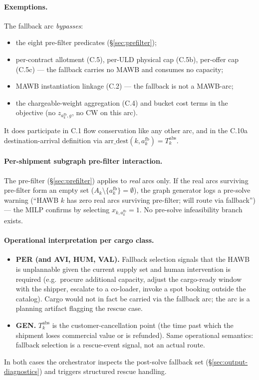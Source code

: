 \documentclass[11pt,a4paper]{article}
\theoremstyle{definition}
\begin{document}
\paragraph{Exemptions.}
The fallback arc \emph{bypasses}:
\begin{itemize}[noitemsep]
  \item the eight pre-filter predicates (\S\ref{sec:prefilter});
  \item per-contract allotment (C.5), per-ULD physical cap (C.5b), per-offer
        cap (C.5c) --- the fallback carries no MAWB and consumes no capacity;
  \item MAWB instantiation linkage (C.2) --- the fallback is not a MAWB-arc;
  \item the chargeable-weight aggregation (C.4) and bucket cost terms in the
        objective (no $z_{a^{\text{fb}}_k, g}$, no $\text{CW}$ on this arc).
\end{itemize}
It does participate in C.1 flow conservation like any other arc, and in the
C.10a destination-arrival definition via $\text{arr\_dest}(k, a^{\text{fb}}_k)
= T_k^{\text{abs}}$.

\paragraph{Per-shipment subgraph pre-filter interaction.}
The pre-filter (\S\ref{sec:prefilter}) applies to \emph{real} arcs only. If
the real arcs surviving pre-filter form an empty set ($A_k \setminus
\{a^{\text{fb}}_k\} = \emptyset$), the graph generator logs a pre-solve
warning (``HAWB $k$ has zero real arcs surviving pre-filter; will route via
fallback'') --- the MILP confirms by selecting $x_{k, a^{\text{fb}}_k} = 1$.
No pre-solve infeasibility branch exists.

\paragraph{Operational interpretation per cargo class.}
\begin{itemize}[noitemsep]
  \item \textbf{PER (and AVI, HUM, VAL).} Fallback selection signals that the
        HAWB is unplannable given the current supply set and human
        intervention is required (e.g.\ procure additional capacity, adjust
        the cargo-ready window with the shipper, escalate to a co-loader,
        invoke a spot booking outside the catalog). Cargo would not in fact
        be carried via the fallback arc; the arc is a planning artifact
        flagging the rescue case.
  \item \textbf{GEN.} $T_k^{\text{abs}}$ is the customer-cancellation point
        (the time past which the shipment loses commercial value or is
        refunded). Same operational semantics: fallback selection is a
        rescue-event signal, not an actual route.
\end{itemize}
In both cases the orchestrator inspects the post-solve fallback set
(\S\ref{sec:output-diagnostics}) and triggers structured rescue handling.
\end{document}
